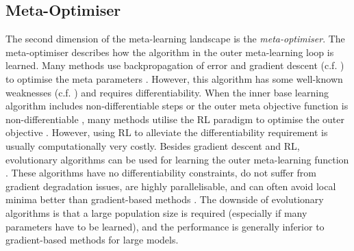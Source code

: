 \subsection{Meta-Optimiser}
The second dimension of the meta-learning landscape is the \emph{meta-optimiser}.
The meta-optimiser describes how the algorithm in the outer meta-learning loop is learned.
Many methods use backpropagation of error and gradient descent (c.f. ) to optimise the meta parameters \cite{ravi2017optimization, 10-5555-3305381-3305498, li2019feature, 10-5555-3305381-3305502, pmlr-v80-franceschi18a, Micaelli_Storkey_2021, pmlr-v108-lorraine20a}.
However, this algorithm has some well-known weaknesses (c.f. ) and requires differentiability.
When the inner base learning algorithm includes non-differentiable steps  or the outer meta objective function is non-differentiable , many methods utilise the RL paradigm to optimise the outer objective .
However, using RL to alleviate the differentiability requirement is usually computationally very costly.
Besides gradient descent and RL, evolutionary algorithms can be used for learning the outer meta-learning function \cite{schmidhuber-1987, Stanley_Clune_Lehman_Miikkulainen_2019, Salimans_Ho_Chen_Sidor_Sutskever_2017}.
These algorithms have no differentiability constraints, do not suffer from gradient degradation issues, are highly parallelisable, and can often avoid local minima better than gradient-based methods .
The downside of evolutionary algorithms is that a large population size is required (especially if many parameters have to be learned), and the performance is generally inferior to gradient-based methods for large models.

